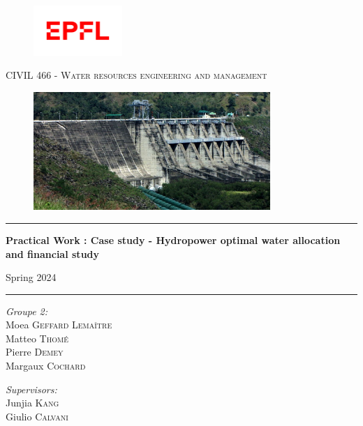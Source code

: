 \documentclass{article}
\begin{document}
\begin{figure}
    \centering
    \includegraphics[width=0.3\textwidth]{LOGO.png}
\end{figure}

\begin{center}

    \textsc{ \Large CIVIL 466 - Water resources engineering and management}\\[0.5cm]
    \begin{figure}[H]
    \centering
    \includegraphics[width=0.8\textwidth]{magat-damm-isabela.jpg}
    \end{figure}
    \vspace{0.3cm}
    \hrule
    \vspace{0.5cm}
    {\Huge \bfseries Practical Work : Case study - Hydropower optimal water allocation and financial study}
    
    
    \vspace{0.5cm}
    
    {\huge \centering \Large Spring 2024}
    
    \vspace{0.5cm}
    \hrule

    \vspace{0.5cm}

    \emph{\Large \centering Groupe 2:}\\
    \vspace{0.5cm}
    \large Moea \textsc{\large Geffard Lemaître}\\
    \large Matteo \textsc{\large Thomé}\\
    \large Pierre \textsc{\large Demey}\\
    \large Margaux \textsc{\large Cochard}\\


    \vspace{0.5cm}

    \emph{\Large \centering Supervisors:}\\
    \vspace{0.5cm}
    \large Junjia   \textsc{\large Kang}\\
    \large Giulio   \textsc{\large Calvani}\\
\end{center}
\end{document}
